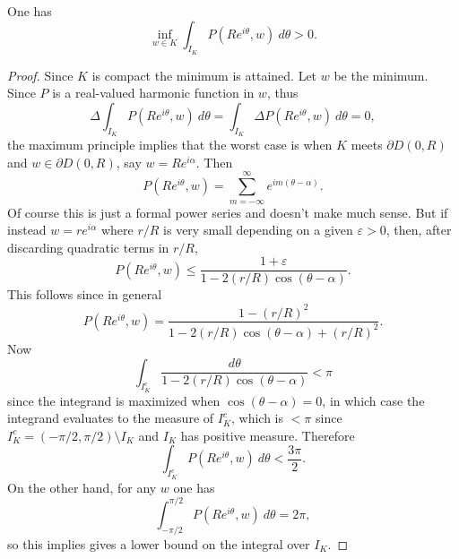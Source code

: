 \documentclass[12pt]{article}
\begin{document}
\begin{lemma}
One has
$$\inf_{w \in K} \int_{I_K} P(Re^{i\theta}, w) ~d\theta > 0.$$
\end{lemma}
\begin{proof}
Since $K$ is compact the minimum is attained. Let $w$ be the minimum. Since $P$ is a real-valued harmonic function in $w$, thus
$$\Delta \int_{I_K} P(Re^{i\theta}, w) ~d\theta = \int_{I_K} \Delta P(Re^{i\theta}, w) ~d\theta = 0,$$
the maximum principle implies that the worst case is when $K$ meets $\partial D(0, R)$ and $w \in \partial D(0, R)$, say $w = Re^{i\alpha}$.
Then
$$P(Re^{i\theta}, w) = \sum_{m=-\infty}^\infty e^{im(\theta - \alpha)}.$$
Of course this is just a formal power series and doesn't make much sense. But if instead $w = re^{i\alpha}$ where $r/R$ is very small depending on a given $\varepsilon > 0$, then, after discarding quadratic terms in $r/R$,
$$P(Re^{i\theta}, w) \leq \frac{1 + \varepsilon}{1 - 2(r/R)\cos(\theta - \alpha)}.$$
This follows since in general
$$P(Re^{i\theta}, w) = \frac{1 - (r/R)^2}{1 - 2(r/R) \cos(\theta - \alpha) + (r/R)^2}.$$
Now
$$\int_{I_K^c} \frac{d\theta}{1 - 2(r/R)\cos(\theta - \alpha)} < \pi$$
since the integrand is maximized when $\cos(\theta - \alpha) = 0$, in which case the integrand evaluates to the measure of $I_K^c$, which is $< \pi$ since $I_K^c = (-\pi/2, \pi/2) \setminus I_K$ and $I_K$ has positive measure.
Therefore
$$\int_{I_K^c} P(Re^{i\theta}, w) ~d\theta < \frac{3\pi}{2}.$$
On the other hand, for any $w$ one has
$$\int_{-\pi/2}^{\pi/2} P(Re^{i\theta}, w) ~d\theta = 2\pi,$$
so this implies gives a lower bound on the integral over $I_K$.
\end{proof}
\end{document}
